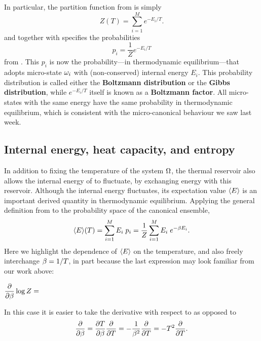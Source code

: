 In particular, the partition function from  is simply
\begin{equation}
  \label{eq:canon_part_func}
  Z(T) = \sum_{i = 1}^M e^{-E_i / T}.
\end{equation}
and together with \be specifies the probabilities
\begin{equation}
  \label{eq:canon_prob}
  p_i = \frac{1}{Z} e^{-E_i / T}
\end{equation}
from .
This $p_i$ is now the probability---in thermodynamic equilibrium---that \Om adopts micro-state $\omega_i$ with (non-conserved) internal energy $E_i$.
This probability distribution is called either the \textbf{Boltzmann distribution} or the \textbf{Gibbs distribution}, while $e^{-E_i / T}$ itself is known as a \textbf{Boltzmann factor}.
All micro-states with the same energy have the same probability in thermodynamic equilibrium, which is consistent with the micro-canonical behaviour we saw last week.



\subsection{Internal energy, heat capacity, and entropy}
In addition to fixing the temperature of the system $\Omega$, the thermal reservoir also allows the internal energy of \Om to fluctuate, by exchanging energy with this reservoir.
Although the internal energy fluctuates, its expectation value $\left\langle E \right\rangle$ is an important derived quantity in thermodynamic equilibrium.
Applying the general definition from  to the probability space of the canonical ensemble,
\begin{equation*}
  \left\langle E \right\rangle\!(T) = \sum_{i = 1}^M E_i \; p_i = \frac{1}{Z} \sum_{i = 1}^M E_i \; e^{-\beta E_i}.
\end{equation*}
\newpage %
\noindent
Here we highlight the dependence of $\left\langle E \right\rangle$ on the temperature, and also freely interchange $\beta = 1 / T$, in part because the last expression may look familiar from our work above:
\begin{mdframed}
  $\displaystyle \frac{\partial }{\partial \beta} \log Z = $ \\[100 pt]
\end{mdframed}
In this case it is easier to take the derivative with respect to \be as opposed to
\begin{equation}
  \label{eq:beta_T}
  \frac{\partial }{\partial \beta} = \frac{\partial T}{\partial \beta} \frac{\partial }{\partial T} = -\frac{1}{\beta^2} \frac{\partial }{\partial T} = -T^2 \frac{\partial }{\partial T}.
\end{equation}

